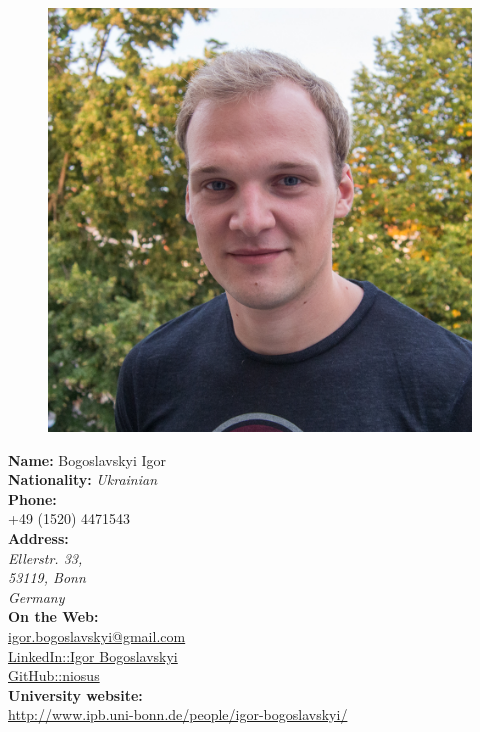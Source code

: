 \documentclass[a4paper,12pt,final]{memoir}
\newcommand{\Sep}{\vspace{1.5em}}
\newcommand{\SmallSep}{\vspace{0.5em}}
\begin{document}
\begin{figure}
	\hfill
	\includegraphics[width=\columnwidth]{igor.jpg}
	\vspace{-5cm}
\end{figure}

\begin{flushleft}\small
	\textbf{Name:} Bogoslavskyi Igor\\
	\SmallSep
	\textbf{Nationality:} \emph{Ukrainian}\\
	\SmallSep
	\textbf{Phone:} \\ +49 (1520) 4471543\\
	\SmallSep
	\textbf{Address:}\\ \emph{Ellerstr. 33, \\53119, Bonn \\Germany}\\
	\Sep
	\textbf{On the Web:}\\
	\SmallSep
	\href{mailto:igor.bogoslavskyi@gmail.com}{igor.bogoslavskyi@gmail.com}\\
	\SmallSep
	\href{https://de.linkedin.com/in/igor-bogoslavskyi-72650b43}{LinkedIn::Igor Bogoslavskyi}\\
	\SmallSep
	\href{https://github.com/niosus}{GitHub::niosus}\\
	\SmallSep
	\textbf{University website:}\\
	\SmallSep
	\url{http://www.ipb.uni-bonn.de/people/igor-bogoslavskyi/}\\
\end{flushleft}
\normalsize
\end{document}
